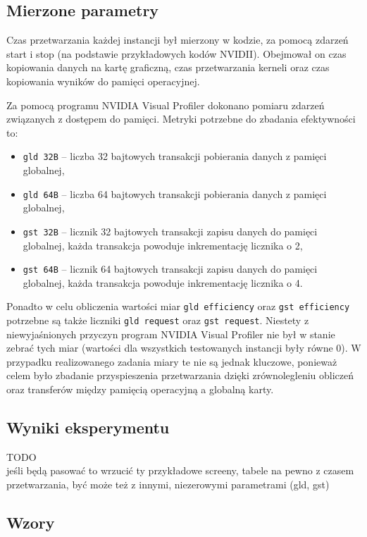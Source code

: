 \documentclass[12pt,a4paper]{article}
\begin{document}
\subsection{Mierzone parametry}

Czas przetwarzania każdej instancji był mierzony w kodzie, za pomocą zdarzeń start i stop (na podstawie przykładowych kodów NVIDII). Obejmował on czas kopiowania danych na kartę graficzną, czas przetwarzania kerneli oraz czas kopiowania wyników do pamięci operacyjnej.

Za pomocą programu NVIDIA Visual Profiler dokonano pomiaru zdarzeń związanych z dostępem do pamięci. Metryki potrzebne do zbadania efektywności to: 
\begin{itemize}
\item \verb|gld 32B| -- liczba 32 bajtowych transakcji pobierania danych z pamięci globalnej,
\item \verb|gld 64B| -- liczba 64 bajtowych transakcji pobierania danych z pamięci globalnej,
\item \verb|gst 32B| -- licznik 32 bajtowych transakcji zapisu danych do pamięci globalnej, każda transakcja powoduje inkrementację licznika o 2,
\item \verb|gst 64B| -- licznik 64 bajtowych transakcji zapisu danych do pamięci globalnej, każda transakcja powoduje inkrementację licznika o 4.
\end{itemize}

Ponadto w celu obliczenia wartości miar \verb|gld efficiency| oraz \verb|gst efficiency| potrzebne są także liczniki  \verb|gld request| oraz  \verb|gst request|. Niestety z niewyjaśnionych przyczyn program NVIDIA Visual Profiler nie był w stanie zebrać tych  miar (wartości dla wszystkich testowanych instancji były równe 0). W przypadku realizowanego zadania miary te nie są jednak kluczowe, ponieważ celem było zbadanie przyspieszenia przetwarzania dzięki zrównolegleniu obliczeń oraz transferów między pamięcią operacyjną a globalną karty.


\subsection{Wyniki eksperymentu}

TODO\\
jeśli będą pasować to wrzucić ty przykładowe screeny, tabele na pewno z czasem przetwarzania, być może też z innymi, niezerowymi parametrami (gld, gst)

\subsection{Wzory}
\end{document}
